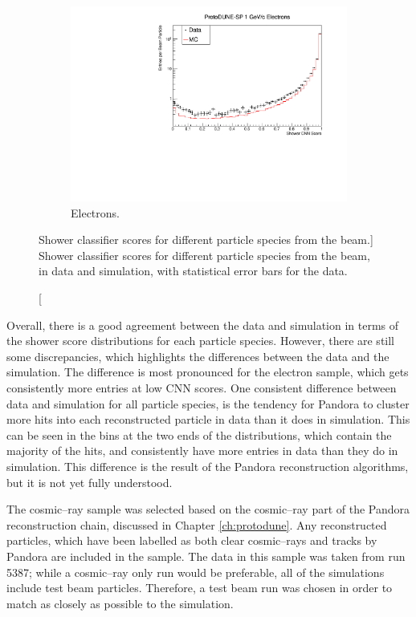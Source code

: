 \begin{figure}
	\begin{subfigure}[b]{0.68\textwidth}
		\centering
		\includegraphics[width=\textwidth]{figures/hit_cnn_electron.pdf}
		\caption {Electrons.}
		\label{fig:beam_electron_cnn}
	\end{subfigure}

	\caption
	[Shower classifier scores for different particle species from the \protodune{} 
	beam.]
	{Shower classifier scores for different particle species from the \protodune{} 
	beam, in data and simulation, with statistical error bars for the data.}
	\label{fig:cnn_scores_beam}

\end{figure}

Overall, there is a good agreement between the data and simulation in terms of
the shower score distributions for each particle species. However, there are
still some discrepancies, which highlights the differences between the data and
the simulation. The difference is most pronounced for the electron sample, which
gets consistently more entries at low CNN scores. One consistent difference
between data and simulation for all particle species, is the tendency for 
Pandora to cluster more hits into each reconstructed particle in data than it 
does in simulation. This can be seen in the bins at the two ends of the 
distributions, which contain the majority of the hits, and consistently have 
more entries in data than they do in simulation. This difference is the result
of the Pandora reconstruction algorithms, but it is not yet fully understood.

The cosmic--ray sample was selected based on the cosmic--ray part of the
Pandora reconstruction chain, discussed in Chapter \ref{ch:protodune}. Any
reconstructed particles, which have been labelled as both clear cosmic--rays
and tracks by Pandora are included in the sample. The data in this sample was
taken from run 5387; while a cosmic--ray only run would be preferable, all of 
the \protodune{} simulations include test beam particles. Therefore, a test beam
run was chosen in order to match as closely as possible to the simulation.

